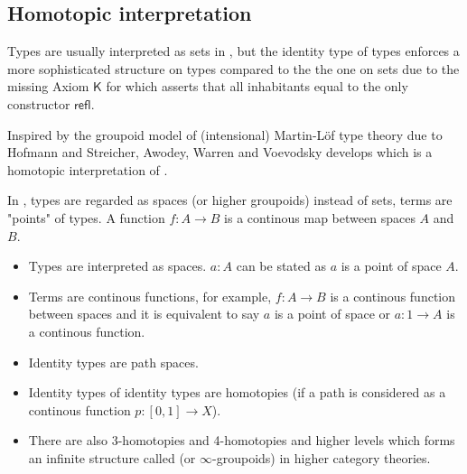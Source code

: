 \subsection{Homotopic interpretation}

Types are usually interpreted as sets in \mltt, but the identity type of types enforces a more sophisticated structure on types compared to the the one on sets due to the missing Axiom $\mathsf{K}$ for which asserts that all inhabitants equal to the only constructor $\mathsf{refl}$. 

Inspired by the groupoid model of (intensional) Martin-Löf type theory due to Hofmann and Streicher, Awodey, Warren \cite{awodey-warren} and Voevodsky \cite{VV} develops \hott which is a homotopic interpretation of \mltt.

In \hott, types are regarded as spaces (or higher groupoids) instead of sets, terms are "points" of types. A function $f : A \to B$ is a continous map between spaces $A$ and $B$.

\begin{itemize}
\item Types are interpreted as spaces. $a : A$ can be stated as $a$ is
  a point of space $A$.
\item Terms are continous functions, for example, $f : A \rightarrow B$ is a
  continous function between spaces and it is equivalent to say $a$ is
  a point of space or $a : 1 \rightarrow A$ is a continous function.
\item Identity types are path spaces.
\item Identity types of identity types are homotopies (if a path is considered as a continous function $p : [0,1] \rightarrow X$).
\item There are also 3-homotopies and 4-homotopies and higher
  levels which forms an infinite structure called \og (or $\infty$-groupoids) in higher category theories.
\end{itemize}

